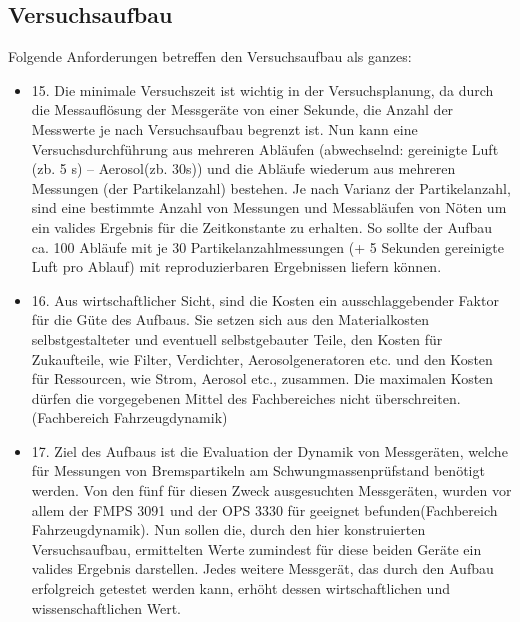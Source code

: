 \subsection{Versuchsaufbau}
Folgende Anforderungen betreffen den Versuchsaufbau als ganzes:

\begin{itemize}
\item 15. Die minimale Versuchszeit ist wichtig in der Versuchsplanung, da durch die Messaufl\"{o}sung der Messger\"{a}te von einer Sekunde, die Anzahl der Messwerte je nach Versuchsaufbau begrenzt ist. Nun kann eine Versuchsdurchf\"{u}hrung aus mehreren Abl\"{a}ufen (abwechselnd: gereinigte Luft (zb. 5 s) -- Aerosol(zb. 30s)) und die Abl\"{a}ufe wiederum aus mehreren Messungen (der Partikelanzahl) bestehen. Je nach Varianz der Partikelanzahl, sind eine bestimmte Anzahl von Messungen und Messabl\"{a}ufen von N\"{o}ten um ein valides Ergebnis für die Zeitkonstante zu erhalten. So sollte der Aufbau ca. 100 Abl\"{a}ufe mit je 30 Partikelanzahlmessungen (+ 5 Sekunden gereinigte Luft pro Ablauf) mit reproduzierbaren Ergebnissen liefern k\"{o}nnen.

\item 16. Aus wirtschaftlicher Sicht, sind die Kosten ein ausschlaggebender Faktor für die G\"{u}te des Aufbaus. Sie setzen sich aus den Materialkosten selbstgestalteter und eventuell selbstgebauter Teile, den Kosten für Zukaufteile, wie Filter, Verdichter, Aerosolgeneratoren etc. und den Kosten f\"{u}r Ressourcen, wie Strom, Aerosol etc., zusammen. Die maximalen Kosten d\"{u}rfen die vorgegebenen Mittel des Fachbereiches nicht \"{u}berschreiten. (Fachbereich Fahrzeugdynamik)

\item 17. Ziel des Aufbaus ist die Evaluation der Dynamik von Messger\"{a}ten, welche f\"{u}r Messungen von Bremspartikeln am Schwungmassenpr\"{u}fstand ben\"{o}tigt werden. Von den f\"{u}nf f\"{u}r diesen Zweck ausgesuchten Messger\"{a}ten, wurden vor allem der FMPS 3091 und der OPS 3330 f\"{u}r geeignet befunden(Fachbereich Fahrzeugdynamik). Nun sollen die, durch den hier konstruierten Versuchsaufbau, ermittelten Werte zumindest f\"{u}r diese beiden Ger\"{a}te ein valides Ergebnis darstellen. Jedes weitere Messger\"{a}t, das durch den Aufbau erfolgreich getestet werden kann, erh\"{o}ht dessen wirtschaftlichen und wissenschaftlichen Wert.
\end{itemize}
